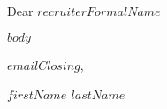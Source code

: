 \documentclass{cobaltCoverLetter}
\date{$date$}
\begin{document}
  \changefontsize[9pt]{9pt}
  \thispagestyle{cobaltHeader}
   \vspace*{2cm}

  \noindent Dear $recruiterFormalName$


  $body$

  \noindent
  $emailClosing$,
  \vspace*{0.75cm}

  \noindent
  \textbf{$firstName$ $lastName$}
\end{document}
